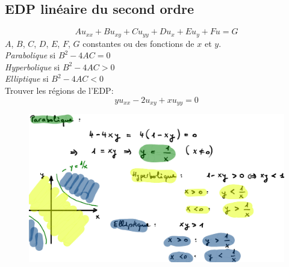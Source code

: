 \subsection*{EDP linéaire du second ordre}
\begin{equation*}
    Au_{xx}+Bu_{xy}+Cu_{yy}+Du_x+Eu_y+Fu=G
\end{equation*}
$A$, $B$, $C$, $D$, $E$, $F$, $G$ constantes ou des fonctions de $x$ et $y$.\\
\textit{Parabolique} si $B^2-4AC=0$\\
\textit{Hyperbolique} si $B^2-4AC>0$\\
\textit{Elliptique} si $B^2-4AC<0$\\
Trouver les régions de l'EDP:
\begin{equation*}
    yu_{xx}-2u_{xy}+xu_{yy}=0
\end{equation*}
\begin{figure}[H]
    \centering
    \includegraphics[width=\linewidth]{images/semaine2_edp_ordre2_classif.png}
\end{figure}



